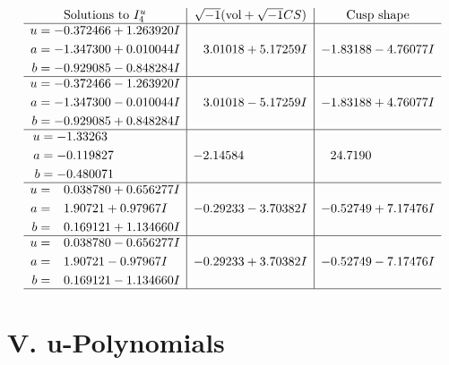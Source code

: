 \documentclass[1p]{elsarticle_modified}
\theoremstyle{definition}
\newcommand{\I}{\sqrt{-1}}
\begin{document}
$$\begin{array}{c|c|c}  
\text{Solutions to }I^u_{4}& \I (\text{vol} + \sqrt{-1}CS) & \text{Cusp shape}\\
 \hline 
\begin{aligned}
u &= -0.372466 + 1.263920 I \\
a &= -1.347300 + 0.010044 I \\
b &= -0.929085 - 0.848284 I\end{aligned}
 & \phantom{-}3.01018 + 5.17259 I & -1.83188 - 4.76077 I \\ \hline\begin{aligned}
u &= -0.372466 - 1.263920 I \\
a &= -1.347300 - 0.010044 I \\
b &= -0.929085 + 0.848284 I\end{aligned}
 & \phantom{-}3.01018 - 5.17259 I & -1.83188 + 4.76077 I \\ \hline\begin{aligned}
u &= -1.33263\phantom{ +0.000000I} \\
a &= -0.119827\phantom{ +0.000000I} \\
b &= -0.480071\phantom{ +0.000000I}\end{aligned}
 & -2.14584\phantom{ +0.000000I} & \phantom{-}24.7190\phantom{ +0.000000I} \\ \hline\begin{aligned}
u &= \phantom{-}0.038780 + 0.656277 I \\
a &= \phantom{-}1.90721 + 0.97967 I \\
b &= \phantom{-}0.169121 + 1.134660 I\end{aligned}
 & -0.29233 - 3.70382 I & -0.52749 + 7.17476 I \\ \hline\begin{aligned}
u &= \phantom{-}0.038780 - 0.656277 I \\
a &= \phantom{-}1.90721 - 0.97967 I \\
b &= \phantom{-}0.169121 - 1.134660 I\end{aligned}
 & -0.29233 + 3.70382 I & -0.52749 - 7.17476 I\\
 \hline 
 \end{array}$$\newpage
\newpage\renewcommand{\arraystretch}{1}
\centering \section*{ V. u-Polynomials}
\end{document}
